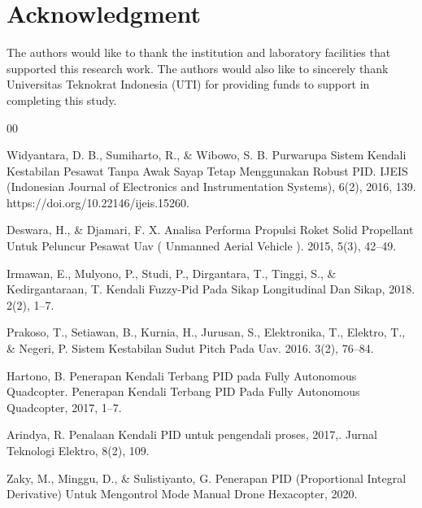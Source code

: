 \documentclass[conference]{IEEEtran}
\begin{document}
\section*{Acknowledgment}
The authors would like to thank the institution and laboratory facilities that supported this research work.
The authors would also like to sincerely thank Universitas Teknokrat Indonesia (UTI) for providing funds to support in completing this study. 

\begin{thebibliography}{00}

Widyantara, D. B., Sumiharto, R., \& Wibowo, S. B. Purwarupa Sistem Kendali Kestabilan Pesawat Tanpa Awak Sayap Tetap Menggunakan Robust PID. IJEIS (Indonesian Journal of Electronics and Instrumentation Systems), 6(2), 2016, 139. https://doi.org/10.22146/ijeis.15260.

Deswara, H., \& Djamari, F. X. Analisa Performa Propulsi Roket Solid Propellant Untuk Peluncur Pesawat Uav ( Unmanned Aerial Vehicle ). 2015, 5(3), 42–49.

Irmawan, E., Mulyono, P., Studi, P., Dirgantara, T., Tinggi, S., \& Kedirgantaraan, T. Kendali Fuzzy-Pid Pada Sikap Longitudinal Dan Sikap, 2018. 2(2), 1–7.

Prakoso, T., Setiawan, B., Kurnia, H., Jurusan, S., Elektronika, T., Elektro, T., \& Negeri, P. Sistem Kestabilan Sudut Pitch Pada Uav. 2016. 3(2), 76–84.

Hartono, B. Penerapan Kendali Terbang PID pada Fully Autonomous Quadcopter. Penerapan Kendali Terbang PID Pada Fully Autonomous Quadcopter, 2017, 1–7.

Arindya, R. Penalaan Kendali PID untuk pengendali proses, 2017,. Jurnal Teknologi Elektro, 8(2), 109.

Zaky, M., Minggu, D., \& Sulistiyanto, G. Penerapan PID (Proportional Integral Derivative) Untuk Mengontrol Mode Manual Drone Hexacopter, 2020.

\end{thebibliography}
\end{document}
